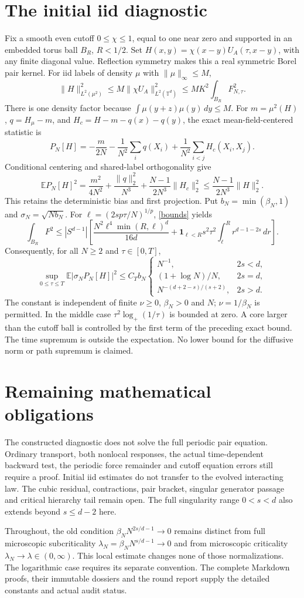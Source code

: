 \documentclass[11pt]{article}
\newcommand{\E}{\mathbb E}
\newcommand{\T}{\mathbb T}
\begin{document}
\section{The initial iid diagnostic}
Fix a smooth even cutoff $0\le\chi\le1$, equal to one near zero and
supported in an embedded torus ball $B_R$, $R<1/2$. Set
$H(x,y)=\chi(x-y)U_A(\tau,x-y)$, with any finite diagonal value.
Reflection symmetry makes this a real symmetric Borel pair kernel.
For iid labels of density $\mu$ with $\|\mu\|_\infty\le M$,
\[
 \|H\|_{L^2(\mu^2)}^2
 \le M\|\chi U_A\|_{L^2(\T^d)}^2
 \le MK^2\int_{B_R}F_{N,\tau}^2.
\]
There is one density factor because
$\int\mu(y+z)\mu(y)\,dy\le M$.
For $m=\mu^2(H)$, $q=H_\mu-m$, and
$H_c=H-m-q(x)-q(y)$, the exact mean-field-centered statistic is
\[
 P_N[H]=-\frac m{2N}-\frac1{N^2}\sum_iq(X_i)
            +\frac1{N^2}\sum_{i<j}H_c(X_i,X_j).
\]
Conditional centering and shared-label orthogonality give
\[
 \E P_N[H]^2=\frac{m^2}{4N^2}+\frac{\|q\|_2^2}{N^3}
       +\frac{N-1}{2N^3}\|H_c\|_2^2
 \le\frac{N-1}{2N^3}\|H\|_2^2.
\]
This retains the deterministic bias and first projection.
Put $b_N=\min(\beta_N,1)$ and $\sigma_N=\sqrt{Nb_N}$.
For $\ell=(2sp\tau/N)^{1/p}$, \eqref{bounds} yields
\[
 \int_{B_R}F^2\le |S^{d-1}|\left[
 \frac{N^2\ell^4\min(R,\ell)^d}{16d}
 +\mathbf1_{\ell<R}s^2\tau^2\int_\ell^Rr^{d-1-2s}\,dr\right].
\]
Consequently, for all $N\ge2$ and $\tau\in[0,T]$,
\[
 \sup_{0\le\tau\le T}\E|\sigma_NP_N[H]|^2
 \le C_T b_N
 \begin{cases}
 N^{-1},&2s<d,\\
 (1+\log N)/N,&2s=d,\\
 N^{-(d+2-s)/(s+2)},&2s>d.
 \end{cases}
\]
The constant is independent of finite $\nu\ge0$, $\beta_N>0$ and $N$;
$\nu=1/\beta_N$ is permitted. In the middle case
$\tau^2\log_+(1/\tau)$ is bounded at zero. A core larger than the cutoff
ball is controlled by the first term of the preceding exact bound.
The time supremum is outside the expectation. No lower bound for the
diffusive norm or path supremum is claimed.

\section{Remaining mathematical obligations}
The constructed diagnostic does not solve the full periodic pair equation.
Ordinary transport, both nonlocal responses, the actual time-dependent
backward test, the periodic force remainder and cutoff equation errors
still require a proof. Initial iid estimates do not transfer to the
evolved interacting law. The cubic residual, contractions, pair bracket,
singular generator passage and critical hierarchy tail remain open.
The full singularity range $0<s<d$ also extends beyond $s\le d-2$ here.

Throughout, the old condition $\beta_NN^{2s/d-1}\to0$ remains distinct
from full microscopic subcriticality
$\lambda_N=\beta_NN^{s/d-1}\to0$ and from microscopic criticality
$\lambda_N\to\lambda\in(0,\infty)$. This local estimate changes none of
those normalizations. The logarithmic case requires its separate convention.
The complete Markdown proofs, their immutable dossiers and the round report
supply the detailed constants and actual audit status.
\end{document}
